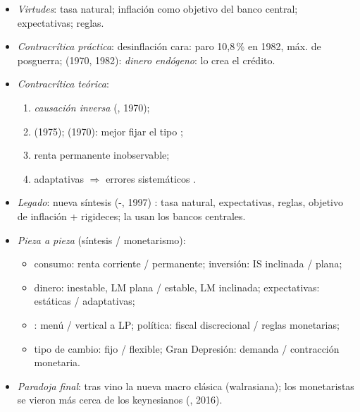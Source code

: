 \documentclass{article}
\begin{document}
\begin{columnas}
\begin{itemize}
\item \emph{Virtudes}: tasa natural; inflación como objetivo del banco central; expectativas; reglas.
\item \emph{Contracrítica práctica}: desinflación cara: paro 10,8\,\% en 1982, máx. de posguerra;  (1970, 1982): \emph{dinero endógeno}: lo crea el crédito.
\item \emph{Contracrítica teórica}:
  \begin{enumerate}
  \item \emph{causación inversa} (, 1970);
  \item {} (1975);  (1970): mejor fijar el tipo ;
  \item renta permanente inobservable;
  \item adaptativas $\Rightarrow$ errores sistemáticos .
  \end{enumerate}
\item \emph{Legado}: nueva síntesis (-, 1997) : tasa natural, expectativas, reglas, objetivo de inflación + rigideces; la usan los bancos centrales.
\item \emph{Pieza a pieza} (síntesis / monetarismo):
  \begin{itemize}
  \item consumo: renta corriente / permanente; inversión: IS inclinada / plana;
  \item dinero: inestable, LM plana / estable, LM inclinada; expectativas: estáticas / adaptativas;
  \item {}: menú / vertical a LP; política: fiscal discrecional / reglas monetarias;
  \item tipo de cambio: fijo / flexible; Gran Depresión: demanda / contracción monetaria.
  \end{itemize}
\item \emph{Paradoja final}: tras  vino la nueva macro clásica (walrasiana); los monetaristas se vieron más cerca de los keynesianos (, 2016).
\end{itemize}


\end{columnas}
\end{document}
